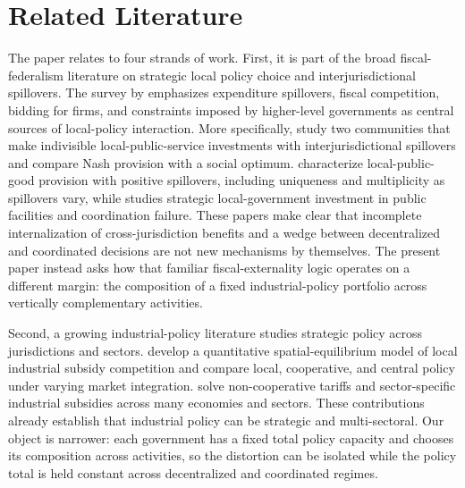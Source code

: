\section{Related Literature}
\label{sec:literature}

The paper relates to four strands of work. First, it is part of the broad fiscal-federalism literature on strategic local policy choice and interjurisdictional spillovers. The survey by \citet{AgrawalHoytWilson2022} emphasizes expenditure spillovers, fiscal competition, bidding for firms, and constraints imposed by higher-level governments as central sources of local-policy interaction. More specifically, \citet{CremerMarchandPestieau1997} study two communities that make indivisible local-public-service investments with interjurisdictional spillovers and compare Nash provision with a social optimum. \citet{BlochZenginobuz2007} characterize local-public-good provision with positive spillovers, including uniqueness and multiplicity as spillovers vary, while \citet{Takahashi2004} studies strategic local-government investment in public facilities and coordination failure. These papers make clear that incomplete internalization of cross-jurisdiction benefits and a wedge between decentralized and coordinated decisions are not new mechanisms by themselves. The present paper instead asks how that familiar fiscal-externality logic operates on a different margin: the composition of a fixed industrial-policy portfolio across vertically complementary activities.

Second, a growing industrial-policy literature studies strategic policy across jurisdictions and sectors. \citet{ChenLi2026} develop a quantitative spatial-equilibrium model of local industrial subsidy competition and compare local, cooperative, and central policy under varying market integration. \citet{WangXuYangZhu2024} solve non-cooperative tariffs and sector-specific industrial subsidies across many economies and sectors. These contributions already establish that industrial policy can be strategic and multi-sectoral. Our object is narrower: each government has a fixed total policy capacity and chooses its composition across activities, so the distortion can be isolated while the policy total is held constant across decentralized and coordinated regimes.

